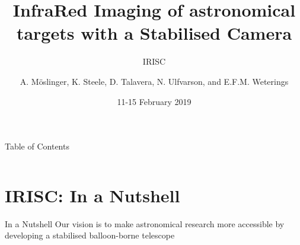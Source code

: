 \documentclass[11pt, aspectratio=169]{beamer}
\author{A. M\"{o}slinger, K. Steele, D. Talavera, N. Ulfvarson, and E.F.M. Weterings}
\title{InfraRed Imaging of astronomical targets with a Stabilised Camera}
\subtitle{IRISC}
\institute{DLR MORABA, Oberpfaffenhofen}
\date{11-15 February 2019}
\begin{document}

{
\begin{frame}
\titlepage
{}
\end{frame}
}

\begin{frame}[t]{Table of Contents}
\vspace{-0.3cm}
    \begin{columns}[t]
        \begin{column}{.5\textwidth}
            \tableofcontents[sections={1-2}]
        \end{column}
        \begin{column}{.5\textwidth}
            \tableofcontents[sections={3-5}]
            \vspace{-.2cm}
            \tableofcontents[sections=6,hidesubsections]
        \end{column}
    \end{columns}
\end{frame}


\section{IRISC: In a Nutshell}
\begin{frame}[c]{In a Nutshell}
    \centering
    \huge Our vision is to make astronomical research more accessible by developing a stabilised balloon-borne telescope
\end{frame}
\end{document}
